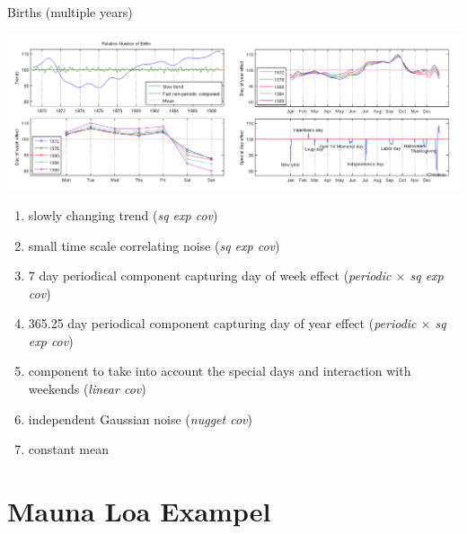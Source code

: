 \documentclass[11pt,ignorenonframetext,]{beamer}
\begin{document}
\begin{frame}{%
\protect\hypertarget{births-multiple-years}{%
Births (multiple years)}}

\begin{adjustwidth}{-10mm}{-10mm}
\begin{center}
\includegraphics[width=\paperwidth]{figs/births_pic2.png}
\end{center}
\end{adjustwidth}

\vspace{-3mm}

\footnotesize

\begin{enumerate}
[1.]
\item
  slowly changing trend (\emph{sq exp cov})
\item
  small time scale correlating noise (\emph{sq exp cov})
\item
  7 day periodical component capturing day of week effect
  (\emph{periodic \(\times\) sq exp cov})
\item
  365.25 day periodical component capturing day of year effect
  (\emph{periodic \(\times\) sq exp cov})
\item
  component to take into account the special days and interaction with
  weekends (\emph{linear cov})
\item
  independent Gaussian noise (\emph{nugget cov})
\item
  constant mean
\end{enumerate}

\end{frame}

\hypertarget{mauna-loa-exampel}{%
\section{Mauna Loa Exampel}\label{mauna-loa-exampel}}
\end{document}
